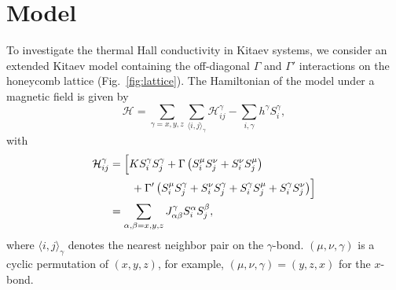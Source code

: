 \documentclass[twocolumn,superscriptaddress,showpacs, longbibliography, aps, prb]{revtex4-2}
\newcommand{\red}[1]{\textcolor{red}{#1}}
\newcommand{\blue}[1]{\textcolor{blue}{#1}}
\newcommand{\orange}[1]{\textcolor{orange}{#1}}
\begin{document}
\section{Model}
\label{sec:model}
To investigate the thermal Hall conductivity %
in Kitaev systems, 
we consider an extended Kitaev model containing the off-diagonal $\Gamma$ and $\Gamma'$ interactions 
on the honeycomb lattice (Fig.~\ref{fig:lattice}). 
The Hamiltonian of the model under a magnetic field is given %
by
\begin{equation}
 \mathcal{H} = \sum_{\gamma = x,y,z} \sum_{\langle i,j \rangle_\gamma}\mathcal{H}_{ij}^\gamma -  \sum_{i,\gamma} h^\gamma S_i^\gamma,
 \label{eq:model-Hamiltonian}
\end{equation}
with
\begin{align}
 \mathcal{H}_{ij}^\gamma &= \Bigl[ K S_i^\gamma S_j^\gamma + \Gamma\left( S_i^\mu S_j^\nu + S_i^\nu S_j^\mu \right) \notag\\
&\qquad + \Gamma'\left( S_i^\mu S_j^\gamma + S_i^\nu S_j^\gamma + S_i^\gamma S_j^\mu + S_i^\gamma S_j^\nu \right) \Bigr]\\
&= \sum_{\alpha,\beta = x,y,z} J_{\alpha\beta}^\gamma S_i^\alpha S_j^\beta, 
\end{align}
where $\langle i,j\rangle_\gamma$ %
denotes the nearest neighbor pair on the $\gamma$-bond. 
$(\mu, \nu, \gamma)$ %
is a cyclic permutation of $(x,y,z)$, for example,
$(\mu, \nu, \gamma)=(y,z,x)$ for the $x$-bond.

\end{document}
